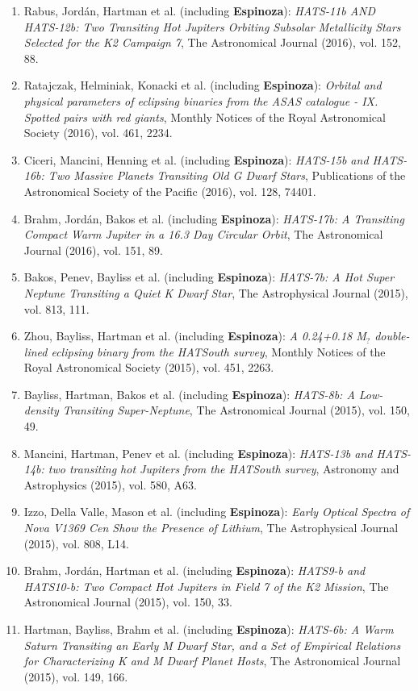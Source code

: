 \documentclass[12pt, a4paper]{article} %
\begin{document}
\begin{flushleft}
\begin{enumerate}
\item Rabus, Jord\'an, Hartman et al. (including \textbf{Espinoza}): \textit{HATS-11b AND HATS-12b: Two Transiting Hot Jupiters Orbiting Subsolar Metallicity Stars Selected for the K2 Campaign 7}, The Astronomical Journal (2016), vol. 152, 88.
\item Ratajczak, Helminiak, Konacki et al. (including \textbf{Espinoza}): \textit{Orbital and physical parameters of eclipsing binaries from the ASAS catalogue - IX. Spotted pairs with red giants}, Monthly Notices of the Royal Astronomical Society (2016), vol. 461, 2234.
\item Ciceri, Mancini, Henning et al. (including \textbf{Espinoza}): \textit{HATS-15b and HATS-16b: Two Massive Planets Transiting Old G Dwarf Stars}, Publications of the Astronomical Society of the Pacific (2016), vol. 128, 74401.
\item Brahm, Jord\'an, Bakos et al. (including \textbf{Espinoza}): \textit{HATS-17b: A Transiting Compact Warm Jupiter in a 16.3 Day Circular Orbit}, The Astronomical Journal (2016), vol. 151, 89.
\item Bakos, Penev, Bayliss et al. (including \textbf{Espinoza}): \textit{HATS-7b: A Hot Super Neptune Transiting a Quiet K Dwarf Star}, The Astrophysical Journal (2015), vol. 813, 111.
\item Zhou, Bayliss, Hartman et al. (including \textbf{Espinoza}): \textit{A 0.24+0.18 M$_{?}$ double-lined eclipsing binary from the HATSouth survey}, Monthly Notices of the Royal Astronomical Society (2015), vol. 451, 2263.
\item Bayliss, Hartman, Bakos et al. (including \textbf{Espinoza}): \textit{HATS-8b: A Low-density Transiting Super-Neptune}, The Astronomical Journal (2015), vol. 150, 49.
\item Mancini, Hartman, Penev et al. (including \textbf{Espinoza}): \textit{HATS-13b and HATS-14b: two transiting hot Jupiters from the HATSouth survey}, Astronomy and Astrophysics (2015), vol. 580, A63.
\item Izzo, Della Valle, Mason et al. (including \textbf{Espinoza}): \textit{Early Optical Spectra of Nova V1369 Cen Show the Presence of Lithium}, The Astrophysical Journal (2015), vol. 808, L14.
\item Brahm, Jord\'an, Hartman et al. (including \textbf{Espinoza}): \textit{HATS9-b and HATS10-b: Two Compact Hot Jupiters in Field 7 of the K2 Mission}, The Astronomical Journal (2015), vol. 150, 33.
\item Hartman, Bayliss, Brahm et al. (including \textbf{Espinoza}): \textit{HATS-6b: A Warm Saturn Transiting an Early M Dwarf Star, and a Set of Empirical Relations for Characterizing K and M Dwarf Planet Hosts}, The Astronomical Journal (2015), vol. 149, 166.

\end{enumerate}
\end{flushleft}
\end{document}
